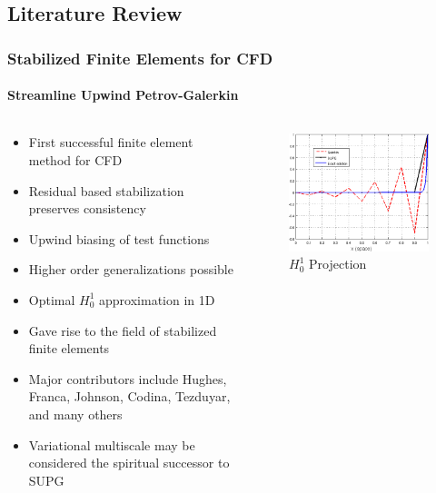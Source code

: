 \documentclass[18pt,xcolor=table]{beamer}
\begin{document}
\subsection{Literature Review}
\begin{frame}[t]
\frametitle{Stabilized Finite Elements for CFD}
\framesubtitle{Streamline Upwind Petrov-Galerkin}
\begin{columns}[c]
\begin{column}{.65\textwidth}
\begin{itemize}
  \item First successful finite element method for CFD\footnotemark
  \item Residual based stabilization preserves consistency
  \item Upwind biasing of test functions
  \item Higher order generalizations possible
  \item Optimal $H_0^1$ approximation in 1D
  \item Gave rise to the field of stabilized finite elements
  \item Major contributors include Hughes, Franca, Johnson, Codina, Tezduyar, and many others
  \item Variational multiscale may be considered the spiritual successor to SUPG\footnotemark
\end{itemize}
\end{column}
\begin{column}{.35\textwidth}
\begin{figure}[t]
\centering
\includegraphics[width=1.0\textwidth]{Motivation/SUPG.png}
\\\small{$H_0^1$ Projection}\\
\end{figure}
\end{column}
\end{columns}
\end{frame}
\end{document}

